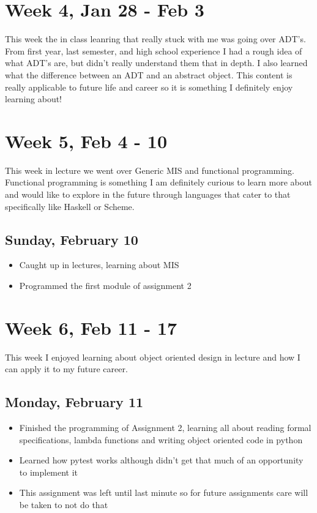 \documentclass{article}
\begin{document}
\section{Week 4, Jan 28 - Feb 3}

This week the in class leanring that really stuck with me was going over ADT's. From first year, last semester, and high school experience I had a rough idea of what ADT's are, but didn't really understand them that in depth. I also learned what the difference between an ADT and an abstract object. This content is really applicable to future life and career so it is something I definitely enjoy learning about!

\section{Week 5, Feb 4 - 10}

This week in lecture we went over Generic MIS and functional programming. Functional programming is something I am definitely curious to learn more about and would like to explore in the future through languages that cater to that specifically like Haskell or Scheme.

\subsection{Sunday, February 10}
\begin{itemize}
    \item Caught up in lectures, learning about MIS
    \item Programmed the first module of assignment 2
\end{itemize}

\section{Week 6, Feb 11 - 17}

This week I enjoyed learning about object oriented design in lecture and how I can apply it to my future career.

\subsection{Monday, February 11}
\begin{itemize}
    \item Finished the programming of Assignment 2, learning all about reading formal specifications, lambda functions and writing object oriented code in python
    \item Learned how pytest works although didn't get that much of an opportunity to implement it
    \item This assignment was left until last minute so for future assignments care will be taken to not do that
\end{itemize}
\end{document}
